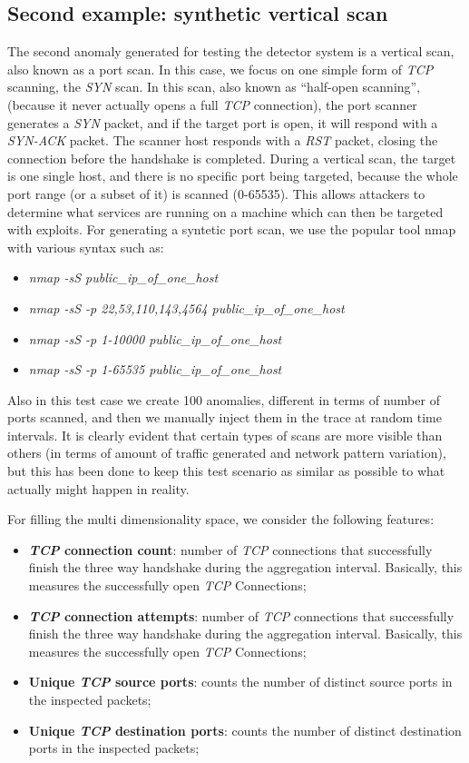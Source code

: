 \documentclass[12pt,a4paper,cucitura]{toptesi}
\begin{document}
\subsection{Second example: synthetic vertical scan}
The second anomaly generated for testing the detector system is a vertical scan, also known as a port scan. In this case, we focus on one simple form of \emph{TCP} scanning, the \emph{SYN} scan. In this scan, also known as ``half-open scanning'', (because it never actually opens a full \emph{TCP} connection), the port scanner generates a \emph{SYN} packet, and if the target port is open, it will respond with a \emph{SYN-ACK} packet. The scanner host responds with a \emph{RST} packet, closing the connection before the handshake is completed.
During a vertical scan, the target is one single host, and there is no specific port being targeted, because the whole port range (or a subset of it) is scanned (0-65535). This allows attackers to determine what services are running on a machine which can then be targeted with exploits.
For generating a syntetic port scan, we use the popular tool nmap with various syntax such as:

\begin{itemize}
\item \emph{nmap -sS public\_ip\_of\_one\_host}
\item \emph{nmap -sS -p 22,53,110,143,4564 public\_ip\_of\_one\_host}
\item \emph{nmap -sS -p 1-10000 public\_ip\_of\_one\_host}
\item \emph{nmap -sS -p 1-65535 public\_ip\_of\_one\_host}
\end{itemize}

Also in this test case we create 100 anomalies, different in terms of number of ports scanned, and then we manually inject them in the trace at random time intervals.
It is clearly evident that certain types of scans are more visible than others (in terms of amount of traffic generated and network pattern variation), but this has been done to keep this test scenario as similar as possible to what actually might happen in reality.

For filling the multi dimensionality space, we consider the following features:

\begin{itemize}
\item \textbf{\emph{TCP} connection count}: number of \emph{TCP} connections that successfully finish the three way handshake during the aggregation interval. Basically, this measures the successfully open \emph{TCP} Connections;
\item \textbf{\emph{TCP} connection attempts}: number of \emph{TCP} connections that successfully finish the three way handshake during the aggregation interval. Basically, this measures the successfully open \emph{TCP} Connections;
\item \textbf{Unique \emph{TCP} source ports}: counts the number of distinct source ports in the inspected packets;
\item \textbf{Unique \emph{TCP} destination ports}: counts the number of distinct destination ports in the inspected packets;
\end{itemize}
\end{document}
